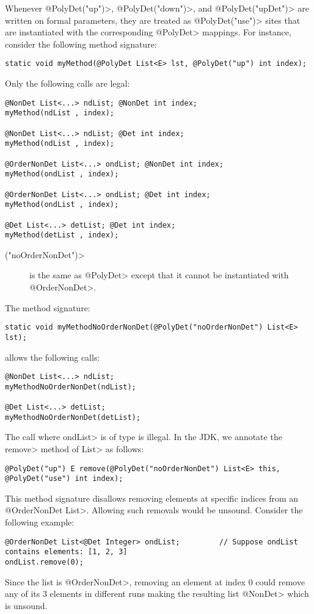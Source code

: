Whenever \<@PolyDet("up")>, \<@PolyDet("down")>, and \<@PolyDet("upDet")> are written on formal parameters,
they are treated as \<@PolyDet("use")> sites that are instantiated with the corresponding \<@PolyDet> mappings.
For instance, consider the following method signature:
\begin{Verbatim}
static void myMethod(@PolyDet List<E> lst, @PolyDet("up") int index);
\end{Verbatim}
Only the following calls are legal:
\begin{Verbatim}
@NonDet List<...> ndList; @NonDet int index;
myMethod(ndList , index);

@NonDet List<...> ndList; @Det int index;
myMethod(ndList , index);

@OrderNonDet List<...> ondList; @NonDet int index;
myMethod(ondList , index);

@OrderNonDet List<...> ondList; @Det int index;
myMethod(ondList , index);

@Det List<...> detList; @Det int index;
myMethod(detList , index);
\end{Verbatim}

\begin{description}
    \item[\<("noOrderNonDet")>] is the same as \<@PolyDet> except that it cannot be instantiated with \<@OrderNonDet>.
\end{description}
The method signature:
\begin{Verbatim}
static void myMethodNoOrderNonDet(@PolyDet("noOrderNonDet") List<E> lst);
\end{Verbatim}
allows the following calls:
\begin{Verbatim}
@NonDet List<...> ndList;
myMethodNoOrderNonDet(ndList);

@Det List<...> detList;
myMethodNoOrderNonDet(detList);
\end{Verbatim}
The call  where \<ondList>  is of type  is illegal.
In the JDK, we annotate the \<remove> method of \<List> as follows:
\begin{Verbatim}
@PolyDet("up") E remove(@PolyDet("noOrderNonDet") List<E> this, @PolyDet("use") int index);
\end{Verbatim}
This method signature disallows removing elements at specific indices from an  \<@OrderNonDet List>.
Allowing such removals would be unsound. Consider the following example:
\begin{Verbatim}
@OrderNonDet List<@Det Integer> ondList;         // Suppose ondList contains elements: [1, 2, 3]
ondList.remove(0);
\end{Verbatim}
Since the list is \<@OrderNonDet>, removing an element at index 0 could remove any of its 3 elements in different runs
making the resulting list \<@NonDet> which is unsound.

